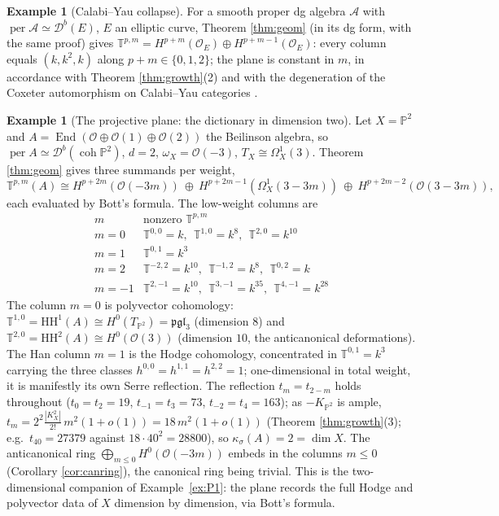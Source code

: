 \documentclass[11pt]{amsart}
\theoremstyle{definition}
\newtheorem{example}[theorem]{Example}
\newcommand{\T}{\mathbb{T}}
\newcommand{\HH}{\mathrm{HH}}
\newcommand{\der}{\mathcal{D}}
\newcommand{\per}{\operatorname{per}}
\newcommand{\kk}{k}
\begin{document}
\begin{example}[Calabi--Yau collapse]\label{ex:ell}
For a smooth proper dg algebra $\mathcal A$ with
$\per\mathcal A\simeq\der^b(E)$, $E$ an elliptic curve, Theorem
\ref{thm:geom} (in its dg form, with the same proof) gives
$\T^{p,m}=H^{p+m}(\mathcal O_E)\oplus H^{p+m-1}(\mathcal O_E)$: every column
equals $(\kk,\kk^2,\kk)$ along $p+m\in\{0,1,2\}$; the plane is constant in
$m$, in accordance with Theorem \ref{thm:growth}(2) and with the degeneration
of the Coxeter automorphism on Calabi--Yau categories
\cite[Example 7.8]{ArmCox}.
\end{example}

\begin{example}[The projective plane: the dictionary in dimension two]\label{ex:P2}
Let $X=\mathbb P^2$ and $A=\operatorname{End}(\mathcal O\oplus\mathcal O(1)\oplus\mathcal O(2))$
the Beilinson algebra, so $\per A\simeq\der^b(\operatorname{coh}\mathbb P^2)$,
$d=2$, $\omega_X=\mathcal O(-3)$, $T_X\cong\Omega^1_X(3)$. Theorem
\ref{thm:geom} gives three summands per weight,
\[
\T^{p,m}(A)\cong H^{p+2m}(\mathcal O(-3m))\ \oplus\ H^{p+2m-1}(\Omega^1_X(3-3m))
\ \oplus\ H^{p+2m-2}(\mathcal O(3-3m)),
\]
each evaluated by Bott's formula. The low-weight columns are
\[
\begin{array}{c|l}
m & \text{nonzero }\T^{p,m}\\
\hline
m=0 & \T^{0,0}=\kk,\ \ \T^{1,0}=\kk^{8},\ \ \T^{2,0}=\kk^{10}\\
m=1 & \T^{0,1}=\kk^{3}\\
m=2 & \T^{-2,2}=\kk^{10},\ \ \T^{-1,2}=\kk^{8},\ \ \T^{0,2}=\kk\\
m=-1 & \T^{2,-1}=\kk^{10},\ \ \T^{3,-1}=\kk^{35},\ \ \T^{4,-1}=\kk^{28}
\end{array}
\]
The column $m=0$ is polyvector cohomology: $\T^{1,0}=\HH^1(A)\cong H^0(T_{\mathbb P^2})
=\mathfrak{pgl}_3$ (dimension $8$) and $\T^{2,0}=\HH^2(A)\cong H^0(\mathcal O(3))$
(dimension $10$, the anticanonical deformations). The Han column $m=1$ is the
Hodge cohomology, concentrated in $\T^{0,1}=\kk^3$ carrying the three classes
$h^{0,0}=h^{1,1}=h^{2,2}=1$; one-dimensional in total weight, it is manifestly
its own Serre reflection. The reflection $t_m=t_{2-m}$ holds throughout
($t_0=t_2=19$, $t_{-1}=t_3=73$, $t_{-2}=t_4=163$); as $-K_{\mathbb P^2}$ is
ample, $t_m=2^2\tfrac{|K_X^2|}{2!}\,m^2(1+o(1))=18\,m^2(1+o(1))$ (Theorem
\ref{thm:growth}(3); e.g.\ $t_{40}=27379$ against $18\cdot40^2=28800$), so
$\kappa_\sigma(A)=2=\dim X$. The anticanonical ring
$\bigoplus_{m\le0}H^0(\mathcal O(-3m))$ embeds in the columns $m\le0$ (Corollary
\ref{cor:canring}), the canonical ring being trivial. This is the
two-dimensional companion of Example~\ref{ex:P1}: the plane records the full
Hodge and polyvector data of $X$ dimension by dimension, via Bott's formula.
\end{example}
\end{document}
